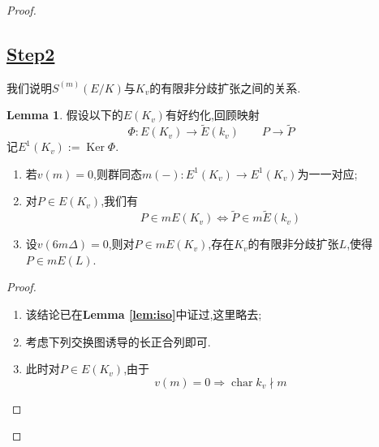 \documentclass[12pt,A4paper,oneside,reqno]{amsart}
\numberwithin{equation}{section}
\theoremstyle{definition}
\newtheorem{lemma}[theorem]{Lemma}
\theoremstyle{plain}
\theoremstyle{plain}
\numberwithin{equation}{section}
\theoremstyle{remark}
\DeclareMathOperator{\cha}{\operatorname{char}}
\DeclareMathOperator{\Ker}{\operatorname{Ker}}
\begin{document}
\begin{proof}
\subsection*{\underline{Step2}}
我们说明$S^{(m)}(E/K)$与$K_v$的有限非分歧扩张之间的关系.
\begin{lemma}\label{lem:conexten}
	假设以下的$E(K_v)$有好约化,回顾映射
	$$\Phi:E(K_v) \longrightarrow \tilde{E}(k_v) \qquad P \longrightarrow \tilde{P}$$
	记$E^1(K_v):=\Ker \Phi$.
	\begin{enumerate}[1.]
		\item 若$v(m)=0$,则群同态$m(-): E^1(K_v)\longrightarrow E^1(K_v)$为一一对应;
		\item \label{item:reducetok} 
		对$P \in E(K_v)$,我们有
		$$P \in mE(K_v) \Longleftrightarrow \tilde{P} \in  m\tilde{E}(k_v) $$
		\item \label{item:findextension}设$v(6m\Delta)=0$,则对$P \in mE(K_v)$,存在$K_v$的有限非分歧扩张$L$,使得$P \in mE(L)$.
	\end{enumerate}
\end{lemma}
\begin{proof}
	\begin{enumerate}[1.]
		\item 该结论已在\textbf{Lemma \ref{lem:iso}}中证过,这里略去;
		\item 考虑下列交换图诱导的长正合列即可.
			\begin{center}
		\end{center}
		\item 此时对$P \in E(K_v)$,由于
		$$v(m)=0 \Longrightarrow \cha k_v \nmid m$$

\end{enumerate}
\end{proof}
\end{proof}
\end{document}
